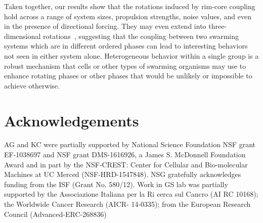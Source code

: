 \documentclass{article}
\begin{document}
Taken together, our results show that the rotations induced by rim-core coupling hold across a range of system sizes, propulsion strengths, noise values, and even in the presence of directional forcing.  They may even extend into three-dimensional rotations~\cite{Rorth2012,Miller2002,Bilder2012,Cai2016}, suggesting that the coupling between two swarming systems which are in different ordered phases can lead to interesting behaviors not seen in either system alone.  Heterogeneous behavior within a single group is a robust mechanism that cells or other types of swarming organisms may use to enhance rotating phases or other phases that would be unlikely or impossible to achieve otherwise. 

\color{white}
\cite{Ferrante2013}
\color{black}

\section*{Acknowledgements}
AG and KC were partially supported by National Science Foundation NSF grant EF-1038697 and NSF grant DMS-1616926, a James S. McDonnell Foundation Award and in part by the NSF-CREST: Center for Cellular and Bio-molecular Machines at UC Merced (NSF-HRD-1547848).  NSG gratefully acknowledges funding from the ISF (Grant No. 580/12).  Work in GS lab was partially supported by the Associazione Italiana per la Ri cerca sul Cancro (AI RC 10168); the 
Worldwide Cancer Research (AICR- 14-0335); from the European Research Council  (Advanced-ERC-268836)
\end{document}
